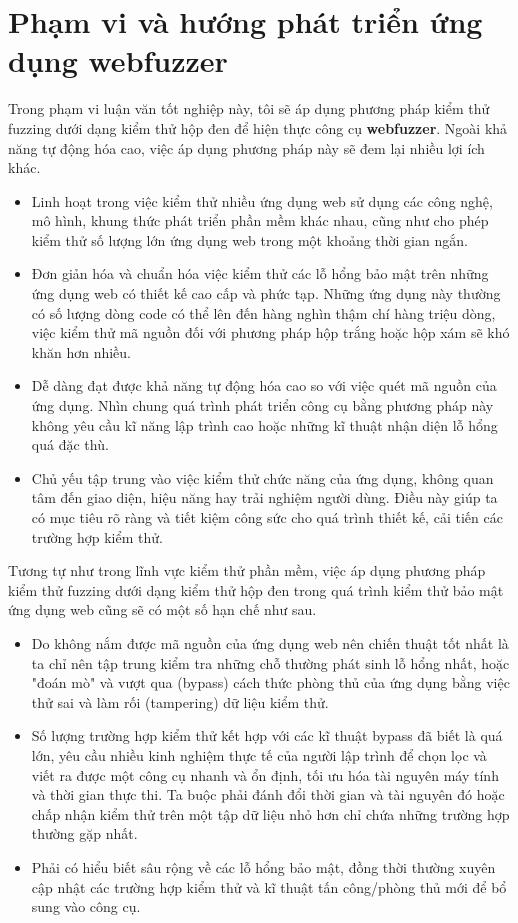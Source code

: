 \section{Phạm vi và hướng phát triển ứng dụng webfuzzer}
Trong phạm vi luận văn tốt nghiệp này, tôi sẽ áp dụng phương pháp kiểm thử fuzzing dưới dạng kiểm thử hộp đen để hiện thực công cụ \textbf{webfuzzer}. Ngoài khả năng tự động hóa cao, việc áp dụng phương pháp này sẽ đem lại nhiều lợi ích khác.
\begin{itemize}
    \item Linh hoạt trong việc kiểm thử nhiều ứng dụng web sử dụng các công nghệ, mô hình, khung thức phát triển phần mềm khác nhau, cũng như cho phép kiểm thử số lượng lớn ứng dụng web trong một khoảng thời gian ngắn.
    \item Đơn giản hóa và chuẩn hóa việc kiểm thử các lỗ hổng bảo mật trên những ứng dụng web có thiết kế cao cấp và phức tạp. Những ứng dụng này thường có số lượng dòng code có thể lên đến hàng nghìn thậm chí hàng triệu dòng, việc kiểm thử mã nguồn đối với phương pháp hộp trắng hoặc hộp xám sẽ khó khăn hơn nhiều.
    \item Dễ dàng đạt được khả năng tự động hóa cao so với việc quét mã nguồn của ứng dụng. Nhìn chung quá trình phát triển công cụ bằng phương pháp này không yêu cầu kĩ năng lập trình cao hoặc những kĩ thuật nhận diện lỗ hổng quá đặc thù.
    \item Chủ yếu tập trung vào việc kiểm thử chức năng của ứng dụng, không quan tâm đến giao diện, hiệu năng hay trải nghiệm người dùng. Điều này giúp ta có mục tiêu rõ ràng và tiết kiệm công sức cho quá trình thiết kế, cải tiến các trường hợp kiểm thử. 
\end{itemize}
Tương tự như trong lĩnh vực kiểm thử phần mềm, việc áp dụng phương pháp kiểm thử fuzzing dưới dạng kiểm thử hộp đen trong quá trình kiểm thử bảo mật ứng dụng web cũng sẽ có một số hạn chế như sau.
\begin{itemize}
    \item Do không nắm được mã nguồn của ứng dụng web nên chiến thuật tốt nhất là ta chỉ nên tập trung kiểm tra những chỗ thường phát sinh lỗ hổng nhất, hoặc "đoán mò" và vượt qua (bypass) cách thức phòng thủ của ứng dụng bằng việc thử sai và làm rối (tampering) dữ liệu kiểm thử.
    \item Số lượng trường hợp kiểm thử kết hợp với các kĩ thuật bypass đã biết là quá lớn, yêu cầu nhiều kinh nghiệm thực tế của người lập trình để chọn lọc và viết ra được một công cụ nhanh và ổn định, tối ưu hóa tài nguyên máy tính và thời gian thực thi. Ta buộc phải đánh đổi thời gian và tài nguyên đó hoặc chấp nhận kiểm thử trên một tập dữ liệu nhỏ hơn chỉ chứa những trường hợp thường gặp nhất.
    \item Phải có hiểu biết sâu rộng về các lỗ hổng bảo mật, đồng thời thường xuyên cập nhật các trường hợp kiểm thử và kĩ thuật tấn công/phòng thủ mới để bổ sung vào công cụ.
\end{itemize}
